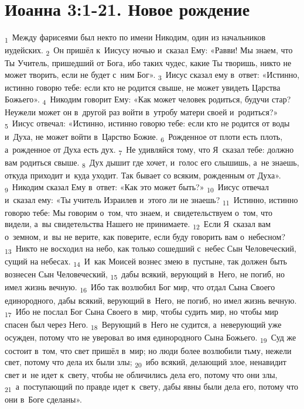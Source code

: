 \documentclass[a4paper,12pt]{article}
\begin{document}

\section{Иоанна 3:1-21. Новое рождение}

\textsubscript{1}~Между фарисеями был некто по имени Никодим, один из начальников иудейских.
\textsubscript{2}~Он пришёл к~Иисусу ночью и~сказал Ему: «Равви! Мы знаем, что Ты Учитель, пришедший от Бога, ибо таких чудес, какие Ты творишь, никто не может творить, если не будет с~ним Бог».
\textsubscript{3}~Иисус сказал ему в~ответ: «Истинно, истинно говорю тебе: если кто не родится свыше, не может увидеть Царства Божьего».
\textsubscript{4}~Никодим говорит Ему: «Как может человек родиться, будучи стар? Неужели может он в~другой раз войти в~утробу матери своей и~родиться?»
\textsubscript{5}~Иисус отвечал: «Истинно, истинно говорю тебе: если кто не родится от воды и~Духа, не может войти в~Царство Божие.
\textsubscript{6}~Рожденное от плоти есть плоть, а~рожденное от Духа есть дух.
\textsubscript{7}~Не удивляйся тому, что Я~сказал тебе: должно вам родиться свыше.
\textsubscript{8}~Дух дышит где хочет, и~голос его слышишь, а~не знаешь, откуда приходит и~куда уходит. Так бывает со всяким, рожденным от Духа».
\textsubscript{9}~Никодим сказал Ему в~ответ: «Как это может быть?»
\textsubscript{10}~Иисус отвечал и~сказал ему: «Ты учитель Израилев и~этого ли не знаешь?
\textsubscript{11}~Истинно, истинно говорю тебе: Мы говорим о~том, что знаем, и~свидетельствуем о~том, что видели, а~вы свидетельства Нашего не принимаете.
\textsubscript{12}~Если Я~сказал вам о~земном, и~вы не верите, как поверите, если буду говорить вам о~небесном?
\textsubscript{13}~Никто не восходил на небо, как только сошедший с~небес Сын Человеческий, сущий на небесах.
\textsubscript{14}~И~как Моисей вознес змею в~пустыне, так должен быть вознесен Сын Человеческий,
\textsubscript{15}~дабы всякий, верующий в~Него, не погиб, но имел жизнь вечную.
\textsubscript{16}~Ибо так возлюбил Бог мир, что отдал Сына Своего единородного, дабы всякий, верующий в~Него, не погиб, но имел жизнь вечную.
\textsubscript{17}~Ибо не послал Бог Сына Своего в~мир, чтобы судить мир, но чтобы мир спасен был через Него.
\textsubscript{18}~Верующий в~Него не судится, а~неверующий уже осужден, потому что не уверовал во имя единородного Сына Божьего.
\textsubscript{19}~Суд же состоит в~том, что свет пришёл в~мир; но люди более возлюбили тьму, нежели свет, потому что дела их были злы;
\textsubscript{20}~ибо всякий, делающий злое, ненавидит свет и~не идет к~свету, чтобы не обличились дела его, потому что они злы,
\textsubscript{21}~а~поступающий по правде идет к~свету, дабы явны были дела его, потому что они в~Боге сделаны».
\end{document}
